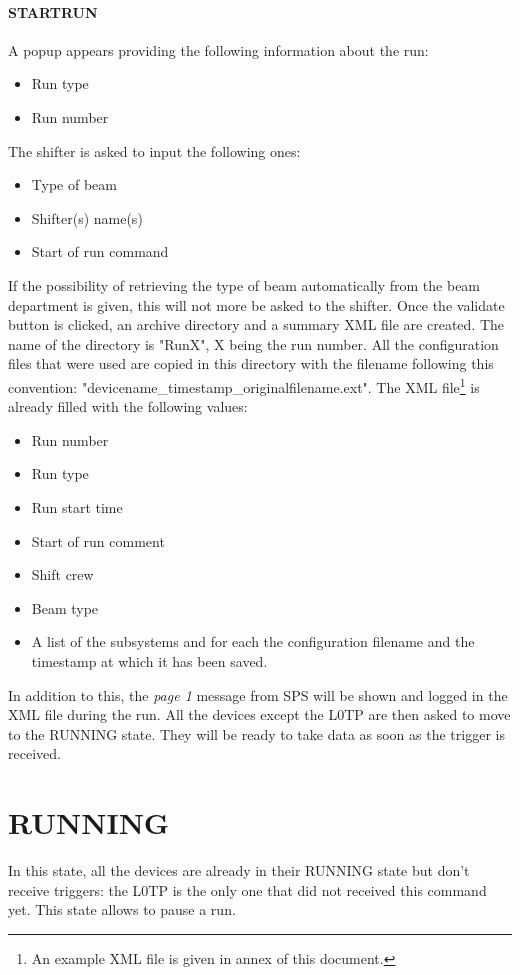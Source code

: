 \documentclass[a4paper]{article}
\begin{document}
\paragraph{STARTRUN} A popup appears providing the following information about the run: 
\begin{itemize}
	\item Run type
	\item Run number
\end{itemize}
The shifter is asked to input the following ones: 
\begin{itemize}
	\item Type of beam
	\item Shifter(s) name(s)
	\item Start of run command
\end{itemize}
If the possibility of retrieving the type of beam automatically from the beam department is given, this will not more be asked to the shifter.
Once the validate button is clicked, an archive directory and a summary XML file are created. The name of the directory is "RunX", X being the run number. All the configuration files that were used are copied in this directory with the filename following this convention: "devicename\_timestamp\_originalfilename.ext". The XML file\footnote{An example XML file is given in annex of this document.} is already filled with the following values:
\begin{itemize}
	\item Run number
	\item Run type
	\item Run start time
	\item Start of run comment
	\item Shift crew
 	\item Beam type
	\item A list of the subsystems and for each the configuration filename and the timestamp at which it has been saved.
\end{itemize}
In addition to this, the \textit{page 1} message from SPS will be shown and logged in the XML file during the run.
All the devices except the L0TP are then asked to move to the RUNNING state. They will be ready to take data as soon as the trigger is received. 

\section{RUNNING}
In this state, all the devices are already in their RUNNING state but don't receive triggers: the L0TP is the only one that did not received this command yet. This state allows to pause a run.
\end{document}
